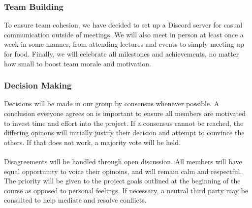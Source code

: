 \documentclass{article}
\begin{document}



\subsubsection*{Team Building}

To ensure team cohesion, we have decided to set up a Discord server for casual communication outside of meetings. We will also meet in person at least once a week in some manner, from attending lectures and events to simply meeting up for food. Finally, we will celebrate all milestones and achievements, no matter how small to boost team morale and motivation.

\subsubsection*{Decision Making} 

Decisions will be made in our group by consensus whenever possible. A conclusion everyone agrees on is important to ensure all members are motivated to invest time and effort into the project. If a consensus cannot be reached, the differing opinons will initially justify their decision and attempt to convince the others. If that does not work, a majority vote will be held.\\\\ Disagreements will be handled through open discussion. All members will have equal opportunity to voice their opinoins, and will remain calm and respectful. The priority will be given to the project goals outlined at the beginning of the course as opposed to personal feelings. If necessary, a neutral third party may be consulted to help mediate and resolve conflicts.
\end{document}
